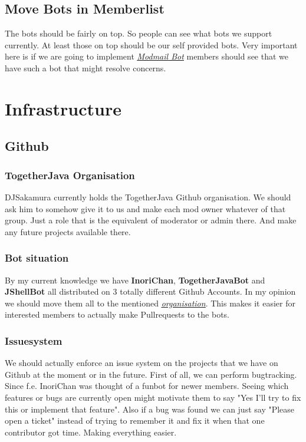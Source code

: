 \documentclass{article}
\newcommand{\refsection}[2]{\hyperref[#1]{\underline{\textit{#2}}}}
\begin{document}
    \subsection{Move Bots in Memberlist}
    The bots should be fairly on top. So people can see what bots we support currently. 
    At least those on top should be our self provided bots. 
    Very important here is if we are going to implement \refsection{sec:modmailbot}{Modmail Bot} members should see that we have such a bot that might resolve concerns.

    \section{Infrastructure}

    \subsection{Github}

    \subsubsection{TogetherJava Organisation}
    \label{sec:githuborganisation}
    DJSakamura currently holds the TogetherJava Github organisation. 
    We should ask him to somehow give it to us and make each mod owner whatever of that group. 
    Just a role that is the equivalent of moderator or admin there. And make any future projects available there.

    \subsubsection{Bot situation}
    By my current knowledge we have \textbf{InoriChan}, \textbf{TogetherJavaBot} and \textbf{JShellBot} all distributed on 3 totally different Github Accounts.
    In my opinion we should move them all to the mentioned \hyperref[sec:githuborganisation]{\underline{\textit{organisation}}}. 
    This makes it easier for interested members to actually make Pullrequests to the bots.

    \subsubsection{Issuesystem}
    We should actually enforce an issue system on the projects that we have on Github at the moment or in the future. 
    First of all, we can perform bugtracking. Since f.e. InoriChan was thought of a funbot for newer members. Seeing which features or 
    bugs are currently open might motivate them to say "Yes I'll try to fix this or implement that feature". Also if a bug was found we can just say 
    "Please open a ticket" instead of trying to remember it and fix it when that one contributor got time. Making everything easier.
\end{document}
